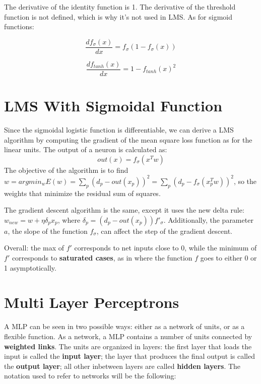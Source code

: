 The derivative of the identity function is 1. The derivative of the threshold function is not defined, which is why it's not used in LMS. As for sigmoid functions:

\begin{equation*}
    \dfrac{df_{\sigma}(x)}{dx} = f_{\sigma}(1-f_{\sigma}(x)) 
\end{equation*}

\begin{equation*}
    \dfrac{df_{tanh}(x)}{dx} = 1 - f_{tanh}(x)^2
\end{equation*}

\section{LMS With Sigmoidal Function}

Since the sigmoidal logistic function is differentiable, we can derive a LMS algorithm by computing the gradient of the mean square loss function as for the linear units. The output of a neuron is calculated as:
\begin{equation*}
    out(x) = f_{\sigma}(x^Tw)
\end{equation*}
The objective of the algorithm is to find $w = argmin_w E(w) = \sum_p (d_p - out(x_p))^2 = \sum_p (d_p - f_{\sigma}(x_p^Tw))^2$, so the weights that minimize the residual sum of squares.

The gradient descent algorithm is the same, except it uses the new delta rule: $w_{new} = w + \eta \delta_p x_p$, where $\delta_p = (d_p - out(x_p))f'_{\sigma}$. Additionally, the parameter $a$, the slope of the function $f_{\sigma}$, can affect the step of the gradient descent.

Overall: the max of $f'$ corresponds to net inputs close to 0, while the minimum of $f'$ corresponds to \textbf{saturated cases}, as in where the function $f$ goes to either 0 or 1 asymptotically.

\section{Multi Layer Perceptrons}

A MLP can be seen in two possible ways: either as a network of units, or as a flexible function. As a network, a MLP contains a number of units connected by \textbf{weighted links}. The units are organized in layers: the first layer that loads the input is called the \textbf{input layer}; the layer that produces the final output is called the \textbf{output layer}; all other inbetween layers are called \textbf{hidden layers}. The notation used to refer to networks will be the following:


